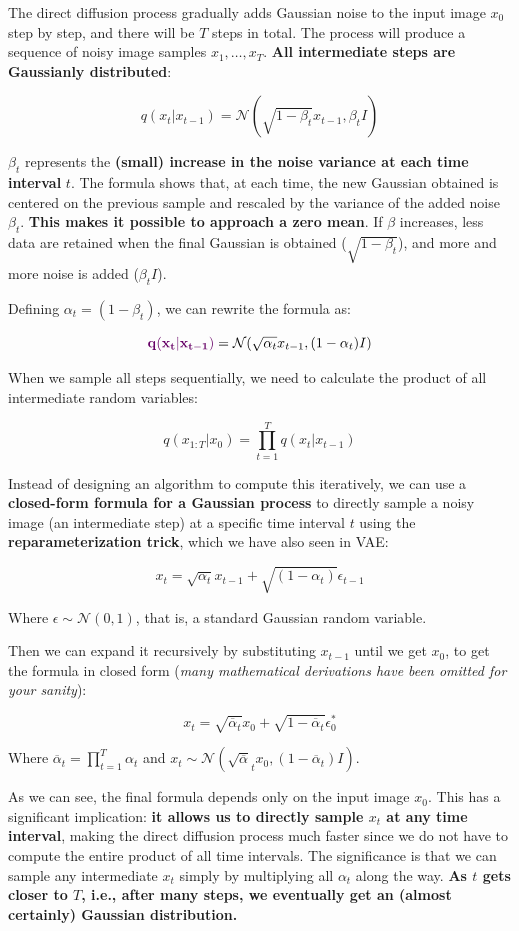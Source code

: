 The direct diffusion process gradually adds Gaussian noise to the input image $x_0$ step by step, and there will be $T$ steps in total. The process will produce a sequence of noisy image samples $x_1, \dots, x_T$. \textbf{All intermediate steps are Gaussianly distributed}:

$$q(x_{t}|x_{t-1}) = \mathcal{N}(\sqrt{1-\beta_t}x_{t-1}, \beta_t I)$$

$\beta_t$ represents the \textbf{(small) increase in the noise variance at each time interval} $t$. The formula shows that, at each time, the new Gaussian obtained is centered on the previous sample and rescaled by the variance of the added noise $\beta_t$. \textbf{This makes it possible to approach a zero mean}. If $\beta$ increases, less data are retained when the final Gaussian is obtained ($\sqrt{1-\beta_t}$), and more and more noise is added ($\beta_t I$).

Defining $\alpha_t = (1- \beta_t)$, we can rewrite the formula as:

$$\mathbf{\textcolor{mypurple}{q(x_{t}|x_{t-1})}} = \mathcal{N}(\sqrt{\alpha_t}x_{t-1}, (1-\alpha_t) I)$$

When we sample all steps sequentially, we need to calculate the product of all intermediate random variables:

$$q(x_{1:T}|x_0) = \prod_{t=1}^{T} q(x_t|x_{t-1})$$

Instead of designing an algorithm to compute this iteratively, we can use a \textbf{closed-form formula for a Gaussian process} to directly sample a noisy image (an intermediate step) at a specific time interval $t$ using the \textbf{reparameterization trick}, which we have also seen in VAE:

$$
x_t = \sqrt{\alpha_t}x_{t-1} + \sqrt{(1-\alpha_t)} \epsilon_{t-1}
$$

Where $\epsilon \sim \mathcal{N}(0,1)$, that is, a standard Gaussian random variable.

Then we can expand it recursively by substituting $x_{t-1}$ until we get $x_0$, to get the formula in closed form (\textit{many mathematical derivations have been omitted for your sanity}):

$$x_t = \sqrt{\overline{\alpha}_t}x_{0} + \sqrt{1-\overline{\alpha}_t}\epsilon_0^*$$

Where $\overline{\alpha}_t = \prod_{t=1}^{T}\alpha_t $ and $x_t \sim \mathcal{N}(\sqrt{\overline{\alpha}}_t x_0, (1- \overline{\alpha}_t)I)$.

As we can see, the final formula depends only on the input image $x_0$. This has a significant implication: \textbf{it allows us to directly sample $x_t$ at any time interval}, making the direct diffusion process much faster since we do not have to compute the entire product of all time intervals. The significance is that we can sample any intermediate $x_t$ simply by multiplying all $\alpha_{t}$ along the way. \textbf{As $t$ gets closer to $T$, i.e., after many steps, we eventually get an (almost certainly) Gaussian distribution.}


